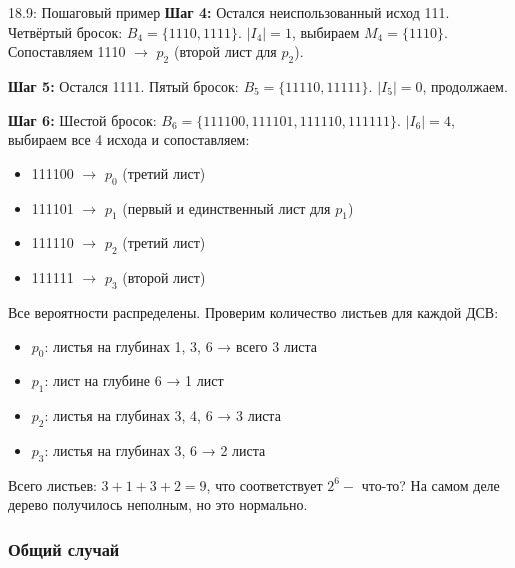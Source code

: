 \documentclass[a4paper,12pt]{article}
\begin{document}
\begin{examplebox}{18.9: Пошаговый пример}
		\textbf{Шаг 4:} Остался неиспользованный исход 111. Четвёртый бросок: \(B_4 = \{1110, 1111\}\). \(|I_4| = 1\), выбираем \(M_4 = \{1110\}\). Сопоставляем 1110 \(\to\) \(p_2\) (второй лист для \(p_2\)).
		
		\textbf{Шаг 5:} Остался 1111. Пятый бросок: \(B_5 = \{11110, 11111\}\). \(|I_5| = 0\), продолжаем.
		
		\textbf{Шаг 6:} Шестой бросок: \(B_6 = \{111100, 111101, 111110, 111111\}\). \(|I_6| = 4\), выбираем все 4 исхода и сопоставляем:
		\begin{itemize}
			\item 111100 \(\to\) \(p_0\) (третий лист)
			\item 111101 \(\to\) \(p_1\) (первый и единственный лист для \(p_1\))
			\item 111110 \(\to\) \(p_2\) (третий лист)
			\item 111111 \(\to\) \(p_3\) (второй лист)
		\end{itemize}
		
		Все вероятности распределены. Проверим количество листьев для каждой ДСВ:
		\begin{itemize}
			\item \(p_0\): листья на глубинах 1, 3, 6 → всего 3 листа
			\item \(p_1\): лист на глубине 6 → 1 лист
			\item \(p_2\): листья на глубинах 3, 4, 6 → 3 листа
			\item \(p_3\): листья на глубинах 3, 6 → 2 листа
		\end{itemize}
		
		Всего листьев: \(3+1+3+2 = 9\), что соответствует \(2^6 -\) что-то? На самом деле дерево получилось неполным, но это нормально.
	\end{examplebox}
	
	\subsubsection{Общий случай}
	
\end{document}
